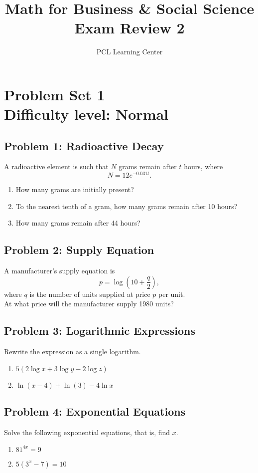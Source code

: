 \documentclass[12pt]{article}
\title{Math for Business \& Social Science\\ Exam Review 2}
\author{PCL Learning Center}
\date{}
\begin{document}
\maketitle

\section*{Problem Set 1\\Difficulty level: Normal}

\subsection*{Problem 1: Radioactive Decay}
A radioactive element is such that \( N \) grams remain after \( t \) hours, where
\[
N = 12e^{-0.031t}.
\]
\begin{enumerate}[label=(\alph*)]
    \item How many grams are initially present?
    \item To the nearest tenth of a gram, how many grams remain after 10 hours?
    \item How many grams remain after 44 hours?
\end{enumerate}

\subsection*{Problem 2: Supply Equation}
A manufacturer’s supply equation is 
\[
p = \log\left(10 + \dfrac{q}{2}\right),
\]
where \( q \) is the number of units supplied at price \( p \) per unit.\\
At what price will the manufacturer supply 1980 units?

\subsection*{Problem 3: Logarithmic Expressions}
Rewrite the expression as a single logarithm.
\begin{enumerate}[label=(\alph*)]
    \item \( 5\left(2\log x + 3\log y - 2\log z\right) \)
    \item \( \ln(x - 4) + \ln(3) - 4\ln x \)
\end{enumerate}

\subsection*{Problem 4: Exponential Equations}
Solve the following exponential equations, that is, find \( x \).
\begin{enumerate}[label=(\alph*)]
    \item \( 81^{4x} = 9 \)
    \item \( 5(3^x - 7) = 10 \)
\end{enumerate}
\end{document}
